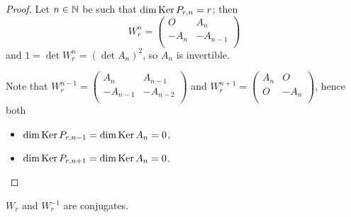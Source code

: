 \begin{proof}
  Let $n\in\mathbb{N}$ be such that $\dim\operatorname{Ker} P_{r,n} = r$; then
  \[
  W_{r}^{n}
  =
  \left(
  \begin{array}{cc}
     O    &  A_{n}  \\
    -A_{n} & -A_{n-1} \\
  \end{array}
  \right)
  \]
  and $1 = \det W_{r}^{n} = (\det A_{n})^{2}$, so $A_{n}$ is
  invertible.

  Note that
  $W_{r}^{n-1} = \left(\begin{smallmatrix} A_{n} & A_{n-1} \\-A_{n-1} & -A_{n-2} \\\end{smallmatrix}\right)$
  and
  $W_{r}^{n+1} = \left(\begin{smallmatrix} A_{n} & O \\ O & -A_{n} \\\end{smallmatrix}\right)$,
  hence both
  \begin{itemize}
    \item $\dim\operatorname{Ker} P_{r,n-1} = \dim\operatorname{Ker} A_{n} = 0$,
    \item $\dim\operatorname{Ker} P_{r,n+1} = \dim\operatorname{Ker} A_{n} = 0$.
  \end{itemize}
\end{proof}

\begin{lemma}
  $W_{r}$ and $W_{r}^{-1}$ are conjugates.
\end{lemma}

